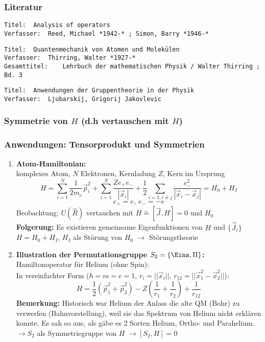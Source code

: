 \documentclass[twoside,a4paper]{scrartcl}
\renewcommand{\1}{\mathds{1}}
\newcommand{\ra}{\rightarrow}
\begin{document}
\subsubsection*{Literatur}
\begin{tiny}
\begin{verbatim}
Titel:	Analysis of operators
Verfasser:	Reed, Michael *1942-* ; Simon, Barry *1946-*
\end{verbatim}
\begin{verbatim}
Titel:	Quantenmechanik von Atomen und Molekülen
Verfasser:	Thirring, Walter *1927-*
Gesamttitel:	Lehrbuch der mathematischen Physik / Walter Thirring ; Bd. 3
\end{verbatim}
\begin{verbatim}
Titel:	Anwendungen der Gruppentheorie in der Physik 
Verfasser:	Ljubarskij, Grigorij Jakovlevic
\end{verbatim}
\end{tiny}

\subsubsection*{Symmetrie von $H$ (d.h vertauschen mit $H$)}

\subsubsection*{Anwendungen: Tensorprodukt und Symmetrien}
\begin{enumerate}
\item \textbf{Atom-Hamiltonian:}\\
komplexes Atom, $N$ Elektronen, Kernladung $Z$, Kern im Ursprung
$$H=\sum_{i=1}^N \frac{1}{2m_e} \vec p_i^2+\sum_{i=1}^N \frac{Z e_+e_-}{|\vec x_i|}+\frac{1}{2} \sum_{i=1, i \neq j} \frac{e_-^2}{|\vec x_i-\vec x_j|}=H_0+H_I$$
$$e_+=e, \ e_-=-e$$
Beobachtung: $U(\hat R)$ vertauchen mit $H \mathrel{\widehat{=}} [\vec J,H]=0$ und $H_0$\\

\textbf{Folgerung:} Es existieren gemeinsame Eigenfunktionen von $H$ und $\{\vec J_i\}$\\
$H=H_0+H_I$, $H_I$ als Störung von $H_0$ $\ra$ Störungstheorie\\

\item \textbf{Illustration der Permutationsgruppe $S_2=\{\Eins, \Pi\}$:} Hamiltonoperator für Helium (ohne Spin):\\
In vereinfachter Form ($\hbar=m=e=1$, $r_i=||\vec x_i||$, $r_{12}=||\vec x_1^2-\vec x_2^2||$): $$H=\frac{1}{2}(\vec p_1^2+\vec p_2^2)-Z(\frac{1}{r_1}+\frac{1}{r_2})+\frac{1}{r_{12}}$$
\textbf{Bemerkung:} Historisch war Helium der Anlass die alte QM (Bohr) zu verwerfen (Bahnvorstellung), weil sie das Spektrum von Helium nicht erklären konnte. Es sah so aus, als gäbe es 2 Sorten Helium, Ortho- und Parahelium.\\
$\ra S_2$ als Symmetriegruppe von $H$ $\ra [S_2,H]=0$ \\
\end{enumerate}
\end{document}
